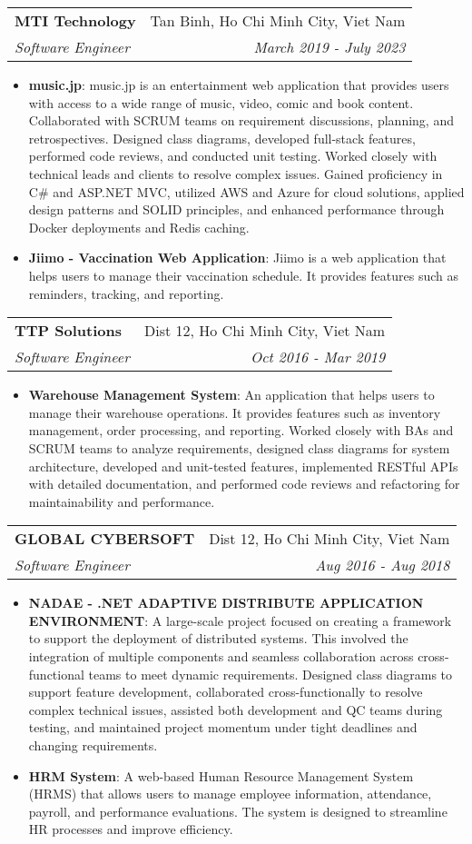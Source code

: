 \documentclass[letterpaper,11pt]{article}
\makeatletter
\newcommand{\resumeItem}[2]{
  \item\small{
    \textbf{#1}{: #2 \vspace{-2pt}}
  }
}
\newcommand{\resumeSubheading}[4]{
  \vspace{-1pt}\item
    \begin{tabular*}{0.97\textwidth}[t]{l@{\extracolsep{\fill}}r}
      \textbf{#1} & #2 \\
      \textit{\small#3} & \textit{\small #4} \\
    \end{tabular*}\vspace{-5pt}
}
\newcommand{\resumeItemListStart}{\begin{itemize}}
\newcommand{\resumeItemListEnd}{\end{itemize}\vspace{-5pt}}
\makeatother
\begin{document}
    \resumeSubheading
      {MTI Technology}{Tan Binh, Ho Chi Minh City, Viet Nam}
      {Software Engineer}{March 2019 - July 2023}
      \resumeItemListStart
        \resumeItem{music.jp}
          {music.jp is an entertainment web application that provides users with access to a wide range of music, video, comic and book content. Collaborated with SCRUM teams on requirement discussions, planning, and retrospectives. Designed class diagrams, developed full-stack features, performed code reviews, and conducted unit testing. Worked closely with technical leads and clients to resolve complex issues.
          Gained proficiency in C\# and ASP.NET MVC, utilized AWS and Azure for cloud solutions, applied design patterns and SOLID principles, and enhanced performance through Docker deployments and Redis caching.}
        \resumeItem{Jiimo - Vaccination Web Application}
          {Jiimo is a web application that helps users to manage their vaccination schedule. It provides features such as reminders, tracking, and reporting.}
      \resumeItemListEnd

    \resumeSubheading
      {TTP Solutions}{Dist 12, Ho Chi Minh City, Viet Nam}
      {Software Engineer}{Oct 2016 - Mar 2019}
      \resumeItemListStart
        \resumeItem{Warehouse Management System}
          {An application that helps users to manage their warehouse operations. It provides features such as inventory management, order processing, and reporting. Worked closely with BAs and SCRUM teams to analyze requirements, designed class diagrams for system architecture, developed and unit-tested features, implemented RESTful APIs with detailed documentation, and performed code reviews and refactoring for maintainability and performance.}
      \resumeItemListEnd

    \resumeSubheading
      {GLOBAL CYBERSOFT}{Dist 12, Ho Chi Minh City, Viet Nam}
      {Software Engineer}{Aug 2016 - Aug 2018}
      \resumeItemListStart
        \resumeItem{NADAE - .NET ADAPTIVE DISTRIBUTE APPLICATION ENVIRONMENT}
          {A large-scale project focused on creating a framework to support the deployment of distributed systems. This involved the integration of multiple components and seamless collaboration across cross-functional teams to meet dynamic requirements.
          Designed class diagrams to support feature development, collaborated cross-functionally to resolve complex technical issues, assisted both development and QC teams during testing, and maintained project momentum under tight deadlines and changing requirements.}
        \resumeItem{HRM System}
          {A web-based Human Resource Management System (HRMS) that allows users to manage employee information, attendance, payroll, and performance evaluations. The system is designed to streamline HR processes and improve efficiency.}
      \resumeItemListEnd
\end{document}
